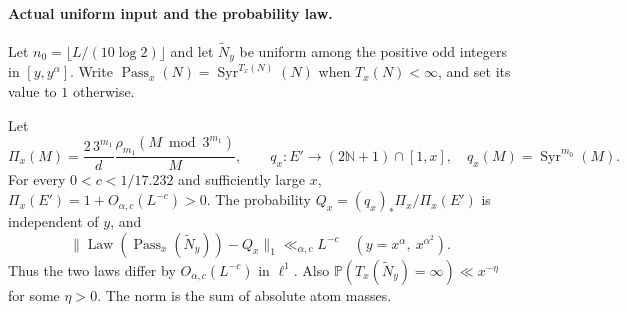 \paragraph{Actual uniform input and the probability law.}
\label{par:Allikvere-actual-input}
Let $n_0=\lfloor L/(10\log2)\rfloor$ and let $\widetilde N_y$
be uniform among the positive odd integers in $[y,y^\alpha]$.
Write $\operatorname{Pass}_x(N)=\operatorname{Syr}^{T_x(N)}(N)$
when $T_x(N)<\infty$, and set its value to $1$ otherwise.

\begin{proposition}
\label{prop:Allikvere-uniform-stabilisation}
Let
\[
 \Pi_x(M)=\frac{2\,3^{m_1}}d\frac{\rho_{m_1}(M\bmod3^{m_1})}{M},
 \qquad q_x:E'\longrightarrow(2\mathbb N+1)\cap[1,x],
 \quad q_x(M)=\operatorname{Syr}^{m_0}(M).
\]
For every $0<c<1/17.232$ and sufficiently large $x$,
$\Pi_x(E')=1+O_{\alpha,c}(L^{-c})>0$. The probability
$Q_x=(q_x)_*\Pi_x/\Pi_x(E')$ is independent of $y$, and
\[
 \|\operatorname{Law}(\operatorname{Pass}_x(\widetilde N_y))-Q_x\|_1
 \ll_{\alpha,c}L^{-c}
 \quad(y=x^\alpha,\ x^{\alpha^2}).
\]
Thus the two laws differ by $O_{\alpha,c}(L^{-c})$ in $\ell^1$.
Also $\mathbb P(T_x(\widetilde N_y)=\infty)\ll x^{-\eta}$ for some
$\eta>0$. The norm is the sum of absolute atom masses.
\end{proposition}
